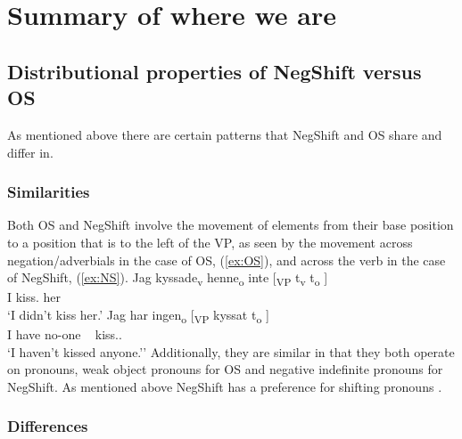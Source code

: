 \documentclass[12pt, letterpaper]{article}
\begin{document}
\section{Summary of where we are} \label{sec:RN}

\subsection{Distributional properties of NegShift versus OS} \label{sec:DISTRIBUTION}

\ea As mentioned above there are certain patterns that NegShift and OS share and differ in.
\z

\subsubsection{Similarities} \label{sec:SIM}

\ea Both OS and NegShift involve the movement of elements from their base position to a position that is to the left of the VP, as seen by the movement across negation/adverbials in the case of OS, (\ref{ex:OS}), and across the verb in the case of NegShift, (\ref{ex:NS}).
	\ea \label{ex:OS} 
	\gll Jag kyssade\textsubscript{v} henne\textsubscript{o} inte [\textsubscript{VP} t\textsubscript{v} t\textsubscript{o} ] \\
	I kiss.\Pst{} her \Neg{}\\
	\glt `I didn't kiss her.'
	\ex \label{ex:NS}
	\gll Jag har ingen\textsubscript{o} [\textsubscript{VP} kyssat t\textsubscript{o} ]\\
	I have no-one ~ kiss.\Pst{}.\Ptcp{} \\
	\glt `I haven't kissed anyone.''
	\z 
\ex Additionally, they are similar in that they both operate on pronouns, weak object pronouns for OS and negative indefinite pronouns for NegShift.
\ex As mentioned above NegShift has a preference for shifting pronouns \citep{christensenInterfacesNegationSyntax2005,penkaNegativeIndefinites2011}.
\z 

\subsubsection{Differences} \label{sec:DIF}
\end{document}
